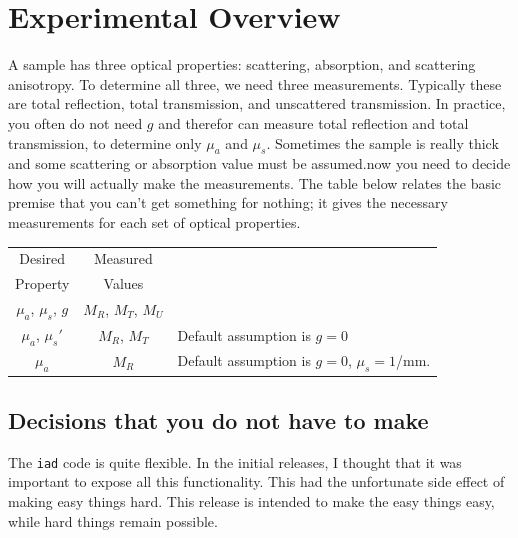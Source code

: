 \documentclass{article}
\newcommand\iadprog{\texttt{iad}}
\begin{document}
\clearpage

\section{Experimental Overview}

A sample has three optical properties: scattering, absorption, and scattering anisotropy.
To determine all three, we need three measurements. Typically these are
total reflection, total transmission, and unscattered transmission. In practice,  
you often do not need $g$ and therefor can measure total reflection and total transmission,
to determine only $\mu_a$ and $\mu_s$.  Sometimes the sample is really thick and some
scattering or absorption value must be assumed.now you need to decide how you will actually make the measurements. The table
below relates the basic premise that you can't get something for nothing; it gives
the necessary measurements for each set of optical properties.

\begin{table}[h!]
\begin{center}
\begin{tabular}{c|c|p{7cm}}
 Desired               & Measured           & \\
 Property              & Values             & \\
\hline
 $\mu_a$, $\mu_s$, $g$ & $M_R$, $M_T$, $M_U$& \\
 $\mu_a$, $\mu_s'$     & $M_R$, $M_T$       & Default assumption is $g=0$\\
 $\mu_a$               & $M_R$              & Default assumption is $g=0$, $\mu_s=1$/mm.\\
\end{tabular}
\end{center}
\end{table}


\subsection{Decisions that you do not have to make}

The \iadprog{} code is quite flexible.  In the initial releases, I thought that
it was important to expose all this functionality.  This had the unfortunate
side effect of making easy things hard.  This release is intended to
make the easy things easy, while hard things remain possible.

\begin{center}
\end{center}
\end{document}
